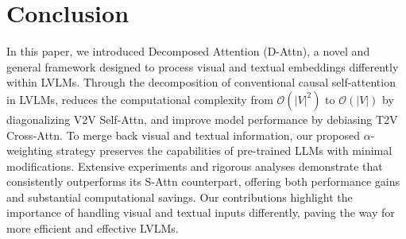 \section{Conclusion}


In this paper, we introduced Decomposed Attention (D-Attn), a novel and general framework designed to process visual and textual embeddings differently within LVLMs.
Through the decomposition of conventional causal self-attention in LVLMs, \method{} reduces the computational complexity from $\mathcal{O}(|V|^2)$ to $\mathcal{O}(|V|)$ by diagonalizing V2V Self-Attn, and improve model performance by debiasing T2V Cross-Attn.
To merge back visual and textual information, our proposed $\alpha$-weighting strategy preserves the capabilities of pre-trained LLMs with minimal modifications.
Extensive experiments and rigorous analyses demonstrate that \method{} consistently outperforms its S-Attn counterpart, offering both performance gains and substantial computational savings.
Our contributions highlight the importance of handling visual and textual inputs differently, paving the way for more efficient and effective LVLMs.
